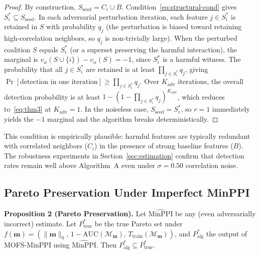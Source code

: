 \documentclass{article} %
\begin{document}
\begin{proof}
By construction, $S_{\text{seed}} = C_i \cup B$. Condition~\eqref{eq:structural-cond} gives $S_i^* \subseteq S_{\text{seed}}$. In each adversarial perturbation iteration, each feature $j \in S_i^*$ is retained in $S$ with probability $q_j$ (the perturbation is biased toward retaining high-correlation neighbors, so $q_j$ is non-trivially large). When the perturbed coalition $S$ equals $S_i^*$ (or a superset preserving the harmful interaction), the marginal is $v_\alpha(S \cup \{i\}) - v_\alpha(S) = -1$, since $S_i^*$ is a harmful witness. The probability that all $j \in S_i^*$ are retained is at least $\prod_{j \in S_i^*} q_j$, giving $\Pr[\text{detection in one iteration}] \geq \prod_{j \in S_i^*} q_j$. Over $K_{\text{adv}}$ iterations, the overall detection probability is at least $1 - (1 - \prod_{j \in S_i^*} q_j)^{K_{\text{adv}}}$, which reduces to~\eqref{eq:thm3} at $K_{\text{adv}} = 1$. In the noiseless case, $S_{\text{seed}} = S_i^*$, so $r = 1$ immediately yields the $-1$ marginal and the algorithm breaks deterministically.
\end{proof}

This condition is empirically plausible: harmful features are typically redundant with correlated neighbors ($C_i$) in the presence of strong baseline features ($B$). The robustness experiments in Section~\ref{sec:estimation} confirm that detection rates remain well above Algorithm~A even under $\sigma=0.50$ correlation noise.

\subsection{Pareto Preservation Under Imperfect MinPPI}

\textbf{Proposition 2 (Pareto Preservation).}
Let $\widehat{\text{MinPPI}}$ be any (even adversarially incorrect) estimate. Let $P^*_{\text{true}}$ be the true Pareto set under $f(\mathbf{m})=(\|\mathbf{m}\|_0,\,1-\text{AUC}(\mathcal{M}_{\mathbf{m}}),\,T_{\text{train}}(\mathcal{M}_{\mathbf{m}}))$, and $P^*_{\text{alg}}$ the output of MOFS-MinPPI using $\widehat{\text{MinPPI}}$. Then $P^*_{\text{alg}} \subseteq P^*_{\text{true}}$.
\end{document}
